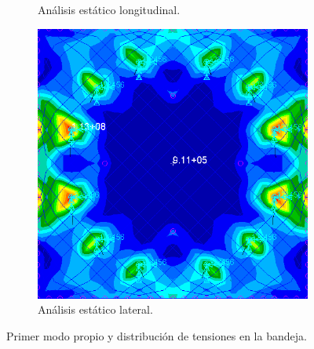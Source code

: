 \begin{figure}[H]
\begin{subfigure}[b]{0.5\linewidth}
    \caption{Análisis estático longitudinal.}
    \label{fig:longitudiz}
  \end{subfigure} 
  \begin{center}
  \begin{subfigure}[b]{0.5\linewidth}
   \centering
    \includegraphics[width=\linewidth]{Figures/StaticXY.png} 
    \caption{Análisis estático lateral.}
    \label{fig:laterallllllllll}
  \end{subfigure}
    \end{center}
 \caption{Primer modo propio y distribución de tensiones en la bandeja.}
 \label{fig: finalfinal} 
\end{figure}